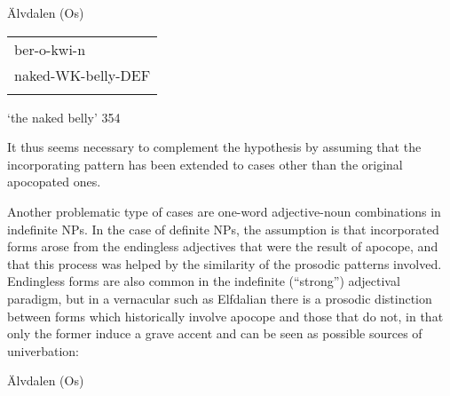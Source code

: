 \begin{listWWNumileveli}
\item 

\begin{styleExample}
\label{bkm:Ref141171937}Älvdalen (Os)

\end{styleExample}

\end{listWWNumileveli}

\begin{tabular}{l}
\lsptoprule
ber-o-kwi-n\\
naked-WK-belly-DEF\\
\lspbottomrule
\end{tabular}

\begin{styleTranslation}
‘the naked belly’ 354

\end{styleTranslation}

\begin{styleBodyTextFirst}
It thus seems necessary to complement the hypothesis by assuming that the incorporating pattern has been extended to cases other than the original apocopated ones.

\end{styleBodyTextFirst}

\begin{styleBodytextC}
Another problematic type of cases are one-word adjective-noun combinations in indefinite NPs. In the case of definite NPs, the assumption is that incorporated forms arose from the endingless adjectives that were the result of apocope, and that this process was helped by the similarity of the prosodic patterns involved. Endingless forms are also common in the indefinite (“strong”) adjectival paradigm, but in a vernacular such as Elfdalian there is a prosodic distinction between forms which historically involve apocope and those that do not, in that only the former induce a grave accent and can be seen as possible sources of univerbation:

\end{styleBodytextC}

\begin{listWWNumileveli}
\item 

\begin{styleExample}
Älvdalen (Os) 

\end{styleExample}

\end{listWWNumileveli}

